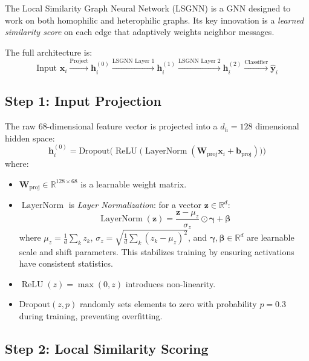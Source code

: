 \documentclass[conference]{IEEEtran}
\newcommand{\R}{\mathbb{R}}
\newcommand{\vect}[1]{\bm{#1}}
\newcommand{\mat}[1]{\mathbf{#1}}
\DeclareMathOperator{\ReLU}{ReLU}
\DeclareMathOperator{\LN}{LayerNorm}
\begin{document}
The Local Similarity Graph Neural Network (LSGNN) is a GNN designed to work on both homophilic and heterophilic graphs. Its key innovation is a \emph{learned similarity score} on each edge that adaptively weights neighbor messages.

The full architecture is:
\begin{equation}
    \text{Input } \vect{x}_i \xrightarrow{\text{Project}} \vect{h}_i^{(0)} \xrightarrow{\text{LSGNN Layer 1}} \vect{h}_i^{(1)} \xrightarrow{\text{LSGNN Layer 2}} \vect{h}_i^{(2)} \xrightarrow{\text{Classifier}} \hat{\vect{y}}_i
\end{equation}

\subsection{Step 1: Input Projection}

The raw 68-dimensional feature vector is projected into a $d_h = 128$ dimensional hidden space:
\begin{equation}
    \vect{h}_i^{(0)} = \text{Dropout}\Big(\ReLU\big(\LN(\mat{W}_{\text{proj}} \vect{x}_i + \vect{b}_{\text{proj}})\big)\Big)
\end{equation}
where:
\begin{itemize}
    \item $\mat{W}_{\text{proj}} \in \R^{128 \times 68}$ is a learnable weight matrix.
    \item $\LN$ is \emph{Layer Normalization}: for a vector $\vect{z} \in \R^d$:
    \begin{equation}
        \LN(\vect{z}) = \frac{\vect{z} - \mu_z}{\sigma_z} \odot \bm{\gamma} + \bm{\beta}
    \end{equation}
    where $\mu_z = \frac{1}{d}\sum_k z_k$, $\sigma_z = \sqrt{\frac{1}{d}\sum_k (z_k - \mu_z)^2}$, and $\bm{\gamma}, \bm{\beta} \in \R^d$ are learnable scale and shift parameters. This stabilizes training by ensuring activations have consistent statistics.
    \item $\ReLU(z) = \max(0, z)$ introduces non-linearity.
    \item $\text{Dropout}(z, p)$ randomly sets elements to zero with probability $p = 0.3$ during training, preventing overfitting.
\end{itemize}

\subsection{Step 2: Local Similarity Scoring}
\end{document}
